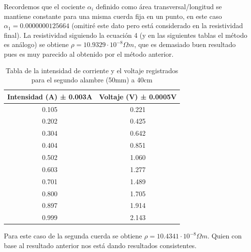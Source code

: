 \documentclass[article,12pt]{elsarticle}
\begin{document}
Recordemos que el cociente $\alpha_i$ definido como área transversal/longitud se mantiene constante para una misma cuerda fija en un punto, en este caso $\alpha_1 = 0.0000000125664$ (omitiré este dato pero está considerado en la resistividad final). La resistividad siguiendo la ecuación 4 (y en las siguientes tablas el método es análogo) se obtiene $\rho = 10.9329 \cdot 10^{-8} \Omega m$, que es demasiado buen resultado pues es muy parecido al obtenido por el método anterior.

    \begin{table}[H]
\begin{tabular}{|c|c|}
\hline
Intensidad (A) ± 0.003A & Voltaje (V) ± 0.0005V \\ \hline
0.105                   & 0.221                 \\ \hline
0.202                   & 0.425                 \\ \hline
0.304                   & 0.642                 \\ \hline
0.404                   & 0.851                 \\ \hline
0.502                   & 1.060                 \\ \hline
0.603                   & 1.277                 \\ \hline
0.701                   & 1.489                 \\ \hline
0.800                   & 1.705                 \\ \hline
0.897                   & 1.914                 \\ \hline
0.999                   & 2.143                 \\ \hline
\end{tabular}
\caption{Tabla de la intensidad de corriente y el voltaje registrados para el segundo alambre (50mm) a 40cm}
\end{table}

Para este caso de la segunda cuerda se obtiene $\rho = 10.4341 \cdot 10^{-8} \Omega m$. Quien con base al resultado anterior nos está dando resultados consistentes.
\end{document}

